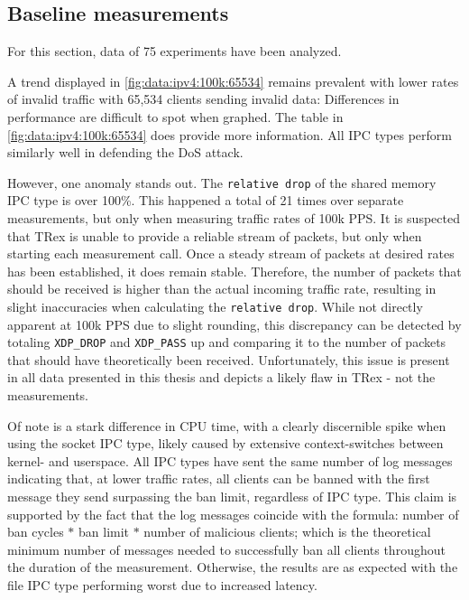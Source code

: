 \subsection{Baseline measurements}
For this section, data of 75 experiments have been analyzed.

A trend displayed in \ref{fig:data:ipv4:100k:65534} remains prevalent with lower rates of invalid traffic with 65,534 clients sending invalid data:
Differences in performance are difficult to spot when graphed.
The table in \ref{fig:data:ipv4:100k:65534} does provide more information.
All \ac{IPC} types perform similarly well in defending the \ac{DoS} attack.

However, one anomaly stands out.
The \texttt{relative drop} of the shared memory \ac{IPC} type is over 100\%.
This happened a total of 21 times over separate measurements, but only when measuring traffic rates of 100k \ac{PPS}.
It is suspected that TRex is unable to provide a reliable stream of packets, but only when starting each measurement call.
Once a steady stream of packets at desired rates has been established, it does remain stable.
Therefore, the number of packets that should be received is higher than the actual incoming traffic rate, resulting in slight inaccuracies when calculating the \texttt{relative drop}.
While not directly apparent at 100k \ac{PPS} due to slight rounding, this discrepancy can be detected by totaling \texttt{XDP\_DROP} and \texttt{XDP\_PASS} up and comparing it to the number of packets that should have theoretically been received.
Unfortunately, this issue is present in all data presented in this thesis and depicts a likely flaw in TRex - not the measurements.

Of note is a stark difference in \ac{CPU} time, with a clearly discernible spike when using the socket \ac{IPC} type, likely caused by extensive context-switches between kernel- and userspace.
All \ac{IPC} types have sent the same number of log messages indicating that, at lower traffic rates, all clients can be banned with the first message they send surpassing the ban limit, regardless of \ac{IPC} type.
This claim is supported by the fact that the log messages coincide with the formula:
number of ban cycles $*$ ban limit $*$ number of malicious clients;
which is the theoretical minimum number of messages needed to successfully ban all clients throughout the duration of the measurement. 
Otherwise, the results are as expected with the file \ac{IPC} type performing worst due to increased latency.

